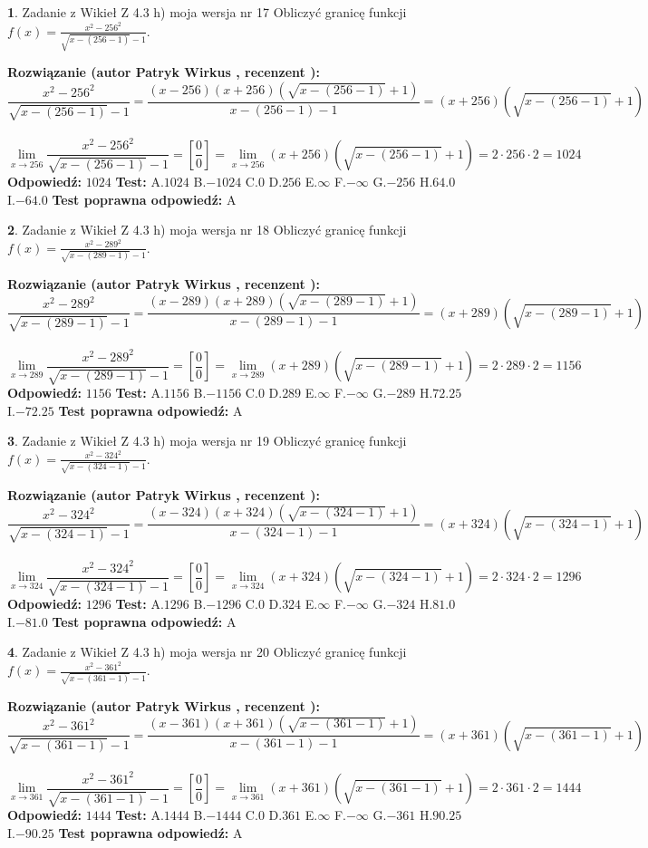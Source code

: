 \documentclass[12pt, a4paper]{article}
\theoremstyle{definition} %
\newtheorem{zad}{}
\newcommand{\zadStart}[1]{\begin{zad}#1\newline}
\newcommand{\zadStop}{\end{zad}}
\newcommand{\rozwStart}[2]{\noindent \textbf{Rozwiązanie (autor #1 , recenzent #2): }\newline}
\newcommand{\rozwStop}{\newline}
\newcommand{\odpStart}{\noindent \textbf{Odpowiedź:}\newline}
\newcommand{\odpStop}{\newline}
\newcommand{\testStart}{\noindent \textbf{Test:}\newline}
\newcommand{\testStop}{\newline}
\newcommand{\kluczStart}{\noindent \textbf{Test poprawna odpowiedź:}\newline}
\newcommand{\kluczStop}{\newline}
\begin{document}
\zadStart{Zadanie z Wikieł Z 4.3 h) moja wersja nr 17}
Obliczyć granicę funkcji $f(x)=\frac{x^{2} - 256^{2}}{\sqrt{x-(256-1)}-1}$.
\zadStop
\rozwStart{Patryk Wirkus}{}
$$\frac{x^{2} - 256^{2}}{\sqrt{x-(256-1)}-1}=\frac{(x-256)(x+256)(\sqrt{x-(256-1)}+1)}{x-(256-1)-1}=(x+256)(\sqrt{x-(256-1)}+1)$$
\\
$$\lim\limits_{x\to 256}\frac{x^{2} - 256^{2}}{\sqrt{x-(256-1)}-1}=[\frac{0}{0}]=
\lim\limits_{x\to 256}(x+256)(\sqrt{x-(256-1)}+1) = 2\cdot256 \cdot 2 = 1024$$
\rozwStop
\odpStart
$1024$
\odpStop
\testStart
A.$1024$
B.$-1024$
C.$0$
D.$256$
E.$\infty$
F.$-\infty$
G.$-256$
H.$64.0$
I.$-64.0$
\testStop
\kluczStart
A
\kluczStop



\zadStart{Zadanie z Wikieł Z 4.3 h) moja wersja nr 18}
Obliczyć granicę funkcji $f(x)=\frac{x^{2} - 289^{2}}{\sqrt{x-(289-1)}-1}$.
\zadStop
\rozwStart{Patryk Wirkus}{}
$$\frac{x^{2} - 289^{2}}{\sqrt{x-(289-1)}-1}=\frac{(x-289)(x+289)(\sqrt{x-(289-1)}+1)}{x-(289-1)-1}=(x+289)(\sqrt{x-(289-1)}+1)$$
\\
$$\lim\limits_{x\to 289}\frac{x^{2} - 289^{2}}{\sqrt{x-(289-1)}-1}=[\frac{0}{0}]=
\lim\limits_{x\to 289}(x+289)(\sqrt{x-(289-1)}+1) = 2\cdot289 \cdot 2 = 1156$$
\rozwStop
\odpStart
$1156$
\odpStop
\testStart
A.$1156$
B.$-1156$
C.$0$
D.$289$
E.$\infty$
F.$-\infty$
G.$-289$
H.$72.25$
I.$-72.25$
\testStop
\kluczStart
A
\kluczStop



\zadStart{Zadanie z Wikieł Z 4.3 h) moja wersja nr 19}
Obliczyć granicę funkcji $f(x)=\frac{x^{2} - 324^{2}}{\sqrt{x-(324-1)}-1}$.
\zadStop
\rozwStart{Patryk Wirkus}{}
$$\frac{x^{2} - 324^{2}}{\sqrt{x-(324-1)}-1}=\frac{(x-324)(x+324)(\sqrt{x-(324-1)}+1)}{x-(324-1)-1}=(x+324)(\sqrt{x-(324-1)}+1)$$
\\
$$\lim\limits_{x\to 324}\frac{x^{2} - 324^{2}}{\sqrt{x-(324-1)}-1}=[\frac{0}{0}]=
\lim\limits_{x\to 324}(x+324)(\sqrt{x-(324-1)}+1) = 2\cdot324 \cdot 2 = 1296$$
\rozwStop
\odpStart
$1296$
\odpStop
\testStart
A.$1296$
B.$-1296$
C.$0$
D.$324$
E.$\infty$
F.$-\infty$
G.$-324$
H.$81.0$
I.$-81.0$
\testStop
\kluczStart
A
\kluczStop



\zadStart{Zadanie z Wikieł Z 4.3 h) moja wersja nr 20}
Obliczyć granicę funkcji $f(x)=\frac{x^{2} - 361^{2}}{\sqrt{x-(361-1)}-1}$.
\zadStop
\rozwStart{Patryk Wirkus}{}
$$\frac{x^{2} - 361^{2}}{\sqrt{x-(361-1)}-1}=\frac{(x-361)(x+361)(\sqrt{x-(361-1)}+1)}{x-(361-1)-1}=(x+361)(\sqrt{x-(361-1)}+1)$$
\\
$$\lim\limits_{x\to 361}\frac{x^{2} - 361^{2}}{\sqrt{x-(361-1)}-1}=[\frac{0}{0}]=
\lim\limits_{x\to 361}(x+361)(\sqrt{x-(361-1)}+1) = 2\cdot361 \cdot 2 = 1444$$
\rozwStop
\odpStart
$1444$
\odpStop
\testStart
A.$1444$
B.$-1444$
C.$0$
D.$361$
E.$\infty$
F.$-\infty$
G.$-361$
H.$90.25$
I.$-90.25$
\testStop
\kluczStart
A
\kluczStop
\end{document}
